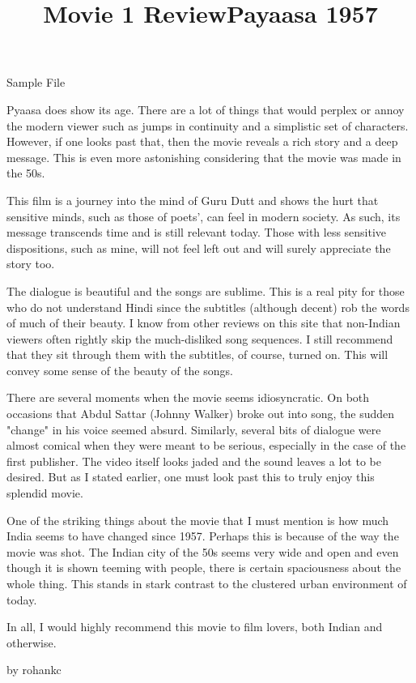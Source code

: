 \documentclass{article}
\begin{document}
\title{Movie 1 Review}


\centerline{\sc \large Sample File}
\vspace{.5pc}
\centerline{\sc }
\vspace{2pc}
\title{Payaasa 1957}

Pyaasa does show its age. There are a lot of things that would perplex or annoy the modern viewer such as jumps in continuity and a simplistic set of characters. However, if one looks past that, then the movie reveals a rich story and a deep message. This is even more astonishing considering that the movie was made in the 50s.

This film is a journey into the mind of Guru Dutt and shows the hurt that sensitive minds, such as those of poets', can feel in modern society. As such, its message transcends time and is still relevant today. Those with less sensitive dispositions, such as mine, will not feel left out and will surely appreciate the story too.

The dialogue is beautiful and the songs are sublime. This is a real pity for those who do not understand Hindi since the subtitles (although decent) rob the words of much of their beauty. I know from other reviews on this site that non-Indian viewers often rightly skip the much-disliked song sequences. I still recommend that they sit through them with the subtitles, of course, turned on. This will convey some sense of the beauty of the songs.

There are several moments when the movie seems idiosyncratic. On both occasions that Abdul Sattar (Johnny Walker) broke out into song, the sudden "change" in his voice seemed absurd. Similarly, several bits of dialogue were almost comical when they were meant to be serious, especially in the case of the first publisher. The video itself looks jaded and the sound leaves a lot to be desired. But as I stated earlier, one must look past this to truly enjoy this splendid movie.

One of the striking things about the movie that I must mention is how much India seems to have changed since 1957. Perhaps this is because of the way the movie was shot. The Indian city of the 50s seems very wide and open and even though it is shown teeming with people, there is certain spaciousness about the whole thing. This stands in stark contrast to the clustered urban environment of today.

In all, I would highly recommend this movie to film lovers, both Indian and otherwise.

by rohankc
\end{document}
